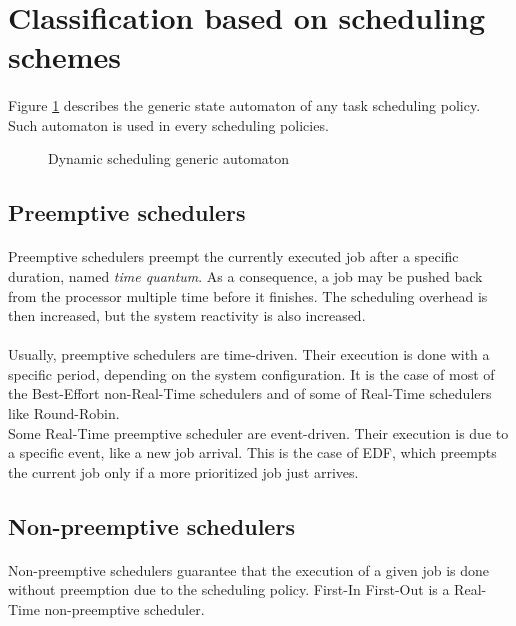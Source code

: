 \section{Classification based on scheduling schemes}

\paragraph{}
Figure \ref{fig:sched_automaton} describes the generic state automaton of any task scheduling
policy. Such automaton is used in every scheduling policies.
\begin{figure}[h]

\caption{Dynamic scheduling generic automaton\label{fig:sched_automaton}}
\end{figure}

\subsection{Preemptive schedulers}

\paragraph{}
Preemptive schedulers preempt the currently executed job after a specific duration, named {\it
time quantum}. As a consequence, a job may be pushed back from the processor
multiple time before it finishes. The scheduling overhead is then increased, but the system
reactivity is also increased.

\paragraph{}
Usually, preemptive schedulers are time-driven. Their execution is done with a specific period,
depending on the system configuration. It is the case of most of the Best-Effort non-Real-Time
schedulers and of some of Real-Time schedulers like Round-Robin.\\
Some Real-Time preemptive scheduler are event-driven. Their execution is due to a specific event,
like a new job arrival. This is the case of EDF, which preempts the current job only if a more
prioritized job just arrives.


\subsection{Non-preemptive schedulers}

\paragraph{}
Non-preemptive schedulers guarantee that the execution of a given job is done without preemption
due to the scheduling policy. First-In First-Out is a Real-Time non-preemptive scheduler.

